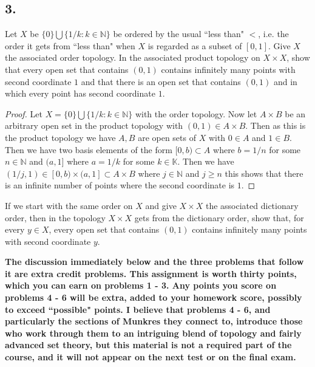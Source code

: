\documentclass{amsart}
\theoremstyle{plain}
\theoremstyle{definition}
\theoremstyle{remark}
\begin{document}
\vspace{.15in}

\noindent
\subsection*{3.} Let $X$ be $\{0\} \bigcup \{ 1/k : k\in \mathbb N \}$ be ordered by the usual ``less than" $<$, i.e. the order it gets from ``less than" when $X$ is regarded as a subset of $[0,1]$. Give $X$ the associated order topology. In the associated product topology on $X\times X$, show that every open set that contains $(0,1)$ contains infinitely many points with second coordinate $1$ and that there is an open set that contains $(0,1)$ and in which every point has second coordinate $1$. 

\begin{proof}
    Let $X= \{0\}\bigcup \{1/k:k\in \mathbb{N}\}$ with the order topology. Now let $A\times B$ be an arbitrary open set in the product topology with $(0,1)\in A\times B$. Then as this is the product topology we have $A,B$ are open sets of $X$ with $0\in A$ and $1\in B$. Then we have two basis elements of the form $[0,b)\subset A$ where $b=1/n$ for some $n\in \mathbb{N}$ and $(a,1]$ where $a=1/k$ for some $k\in \mathbb{K}$. Then we have $(1/j,1)\in [0,b)\times (a,1]\subset A\times B$ where $j\in \mathbb{N}$ and $j\geq n$ this shows that there is an infinite number of points where the second coordinate is $1$. 
    
    
\end{proof}

If we start with the same order on $X$ and give $X\times X$ the associated dictionary order, then in the topology $X\times X$ gets from the dictionary order, show that, for every $y\in X$, every open set that contains $(0,1)$ contains infinitely many points with second coordinate $y$.

\vspace{.25in} {\bf The discussion immediately below and the three problems that follow it are extra credit problems. This assignment is worth thirty points, which you can earn on problems 1 - 3. Any points you score on problems 4 - 6 will be extra, added to your homework score, possibly to exceed ``possible" points. I believe that problems 4 - 6, and particularly the sections of Munkres they connect to, introduce those who work through them to an intriguing blend of topology and fairly advanced set theory, but this material is not a required part of the course, and it will not appear on the next test or on the final exam.}
 
\end{document}

